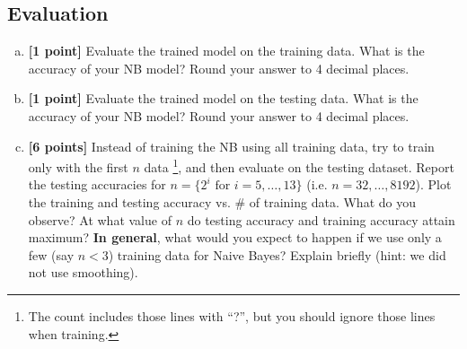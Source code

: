 \documentclass{article}
\newenvironment{soln}{
	\leavevmode\color{blue}\ignorespaces
}{}
\begin{document}
\subsection{Evaluation}

\begin{enumerate}[(a)]
\item \textbf{[1 point]} Evaluate the trained model on the training data. What is the accuracy of your NB model? Round your answer to 4 decimal places. \\
\begin{soln}

\end{soln}

\item \textbf{[1 point]} Evaluate the trained model on the testing data. What is the accuracy of your NB model? Round your answer to 4 decimal places. \\
\begin{soln}

\end{soln}

\item \textbf{[6 points]} Instead of training the NB using all training data, try to train only with the first $n$ data \footnote{The count includes those lines with ``?'', but you should ignore those lines when training.}, and then evaluate on the testing dataset. Report the testing accuracies for $n=\{2^i \text{ for } i=5, \dots, 13\}$ (i.e. $n=32, \dots, 8192$). Plot the training and testing accuracy vs. \# of training data. What do you observe? At what value of $n$ do testing accuracy and training accuracy attain maximum? \textbf{In general}, what would you expect to happen if we use only a few (say $n<3$) training data for Naive Bayes? Explain briefly (hint: we did not use smoothing). \\
\begin{soln}

\end{soln}
\end{enumerate}
\end{document}
